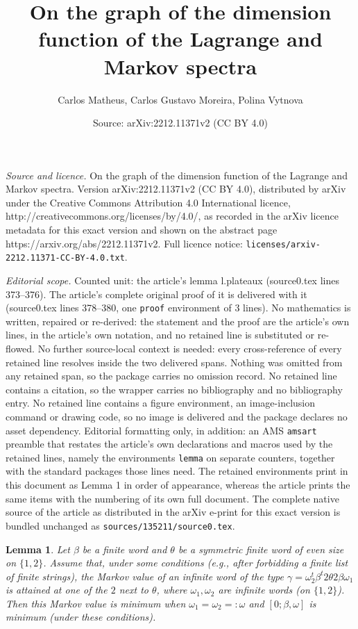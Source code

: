 \documentclass[10pt,a4paper]{amsart}
\title{On the graph of the dimension function of the Lagrange and Markov spectra}
\author{Carlos Matheus, Carlos Gustavo Moreira, Polina Vytnova}
\date{Source: arXiv:2212.11371v2 (CC BY 4.0)}
\newtheorem{lemma}{Lemma}
\begin{document}
\maketitle

\noindent\emph{Source and licence.} On the graph of the dimension function of the Lagrange and Markov spectra. Version arXiv:2212.11371v2 (CC BY 4.0), distributed by arXiv under the Creative Commons Attribution 4.0 International licence, http://creativecommons.org/licenses/by/4.0/, as recorded in the arXiv licence metadata for this exact version and shown on the abstract page https://arxiv.org/abs/2212.11371v2. Full licence notice: \texttt{licenses/arxiv-2212.11371-CC-BY-4.0.txt}.\par\smallskip

\noindent\textit{Editorial scope.} Counted unit: the article's lemma l.plateaux (source0.tex lines 373--376). The article's complete original proof of it is delivered with it (source0.tex lines 378--380, one \texttt{proof} environment of 3 lines). No mathematics is written, repaired or re-derived: the statement and the proof are the article's own lines, in the article's own notation, and no retained line is substituted or re-flowed.  No further source-local context is needed: every cross-reference of every retained line resolves inside the two delivered spans.  Nothing was omitted from any retained span, so the package carries no omission record.  No retained line contains a citation, so the wrapper carries no bibliography and no bibliography entry.  No retained line contains a figure environment, an image-inclusion command or drawing code, so no image is delivered and the package declares no asset dependency.  Editorial formatting only, in addition: an AMS \texttt{amsart} preamble that restates the article's own declarations and macros used by the retained lines, namely the environments \texttt{lemma} on separate counters, together with the standard packages those lines need.  The retained environments print in this document as Lemma 1 in order of appearance, whereas the article prints the same items with the numbering of its own full document.  The complete native source of the article as distributed in the arXiv e-print for this exact version is bundled unchanged as \texttt{sources/135211/source0.tex}.
\begin{lemma}
    \label{l.plateaux} 
    Let $\beta$ be a finite word and $\theta$ be a symmetric finite word of even size on $\{1,2\}$. Assume that, under some conditions (e.g., after forbidding a finite list of finite strings), the Markov value of an infinite word of the type $\gamma=\omega_2^t \beta^t 2\theta 2\beta \omega_1$ is attained at one of the $2$ next to $\theta$, where $\omega_1, \omega_2$ are infinite words (on $\{1,2\}$). Then this Markov value is minimum when $\omega_1=\omega_2=:\omega$ and $[0;\beta,\omega]$ is minimum (under these conditions).
\end{lemma} 
\end{document}
